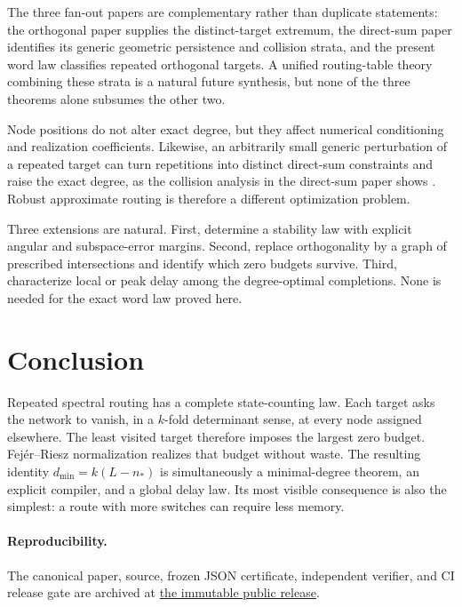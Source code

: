 \documentclass[11pt]{article}
\theoremstyle{definition}\newtheorem{definition}[theorem]{Definition}\newtheorem{example}[theorem]{Example}
\theoremstyle{remark}\newtheorem{remark}[theorem]{Remark}\newtheorem{limitation}[theorem]{Limitation}
\begin{document}
The three fan-out papers are complementary rather than duplicate statements:
the orthogonal paper supplies the distinct-target extremum, the direct-sum
paper identifies its generic geometric persistence and collision strata,
and the present word law classifies repeated orthogonal targets.  A unified
routing-table theory combining these strata is a natural future synthesis,
but none of the three theorems alone subsumes the other two.

Node positions do not alter exact degree, but they affect numerical
conditioning and realization coefficients.  Likewise, an arbitrarily small
generic perturbation of a repeated target can turn repetitions into distinct
direct-sum constraints and raise the exact degree, as the collision analysis
in the direct-sum paper shows \cite{ErikssonDirectSum2026}.  Robust
approximate routing is therefore a different optimization problem.

Three extensions are natural.  First, determine a stability law with
explicit angular and subspace-error margins.  Second, replace orthogonality
by a graph of prescribed intersections and identify which zero budgets
survive.  Third, characterize local or peak delay among the degree-optimal
completions.  None is needed for the exact word law proved here.

\section{Conclusion}

Repeated spectral routing has a complete state-counting law.  Each target
asks the network to vanish, in a $k$-fold determinant sense, at every node
assigned elsewhere.  The least visited target therefore imposes the largest
zero budget.  Fej\'er--Riesz normalization realizes that budget without
waste.  The resulting identity $d_{\min}=k(L-n_*)$ is simultaneously a
minimal-degree theorem, an explicit compiler, and a global delay law.  Its
most visible consequence is also the simplest: a route with more switches
can require less memory.

\paragraph{Reproducibility.}
The canonical paper, source, frozen JSON certificate, independent verifier,
and CI release gate are archived at
\href{https://github.com/lluiseriksson/finite-sample-spectral-certificates/releases/tag/v2.5-routing-word-memory-final}{the immutable public release}.



\end{document}
